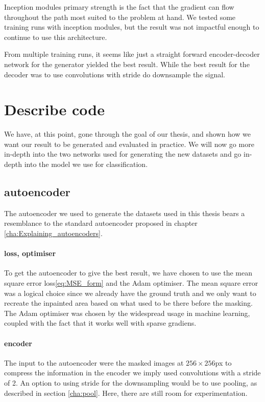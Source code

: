Inception modules primary strength is the fact that the gradient can flow throughout the path most suited to the problem at hand.
We tested some training runs with inception modules, but the result was not impactful enough to continue to use this architecture.

From multiple training runs, it seems like just a straight forward encoder-decoder network for the generator yielded the best result. While the best result for the decoder was to use convolutions with stride do downsample the signal.




 
\section{Describe code}
We have, at this point, gone through the goal of our thesis, and shown how we want our result to be generated and evaluated in practice. 
We will now go more in-depth into the two networks used for generating the new datasets and go in-depth into the model we use for classification.


\subsection{autoencoder}
The autoencoder we used to generate the datasets used in this thesis bears a resemblance to the standard autoencoder proposed in chapter \ref{cha:Explaining_autoencoders}.

\paragraph{loss, optimiser}
To get the autoencoder to give the best result, we have chosen to use the mean square error loss\ref{eq:MSE_form} and the Adam\cite{adam} optimiser.
The mean square error was a logical choice since we already have the ground truth and we only want to recreate the inpainted area based on what used to be there before the masking.
The Adam optimiser was chosen by the widespread usage in machine learning, coupled with the fact that it works well with sparse gradiens.

\paragraph{encoder}
The input to the autoencoder were the masked images at $256 \times 256$px to compress the information in the encoder we imply used convolutions with a stride of 2. An option to using stride for the downsampling would be to use pooling, as described in section \ref{cha:pool}. Here, there are still room for experimentation.



